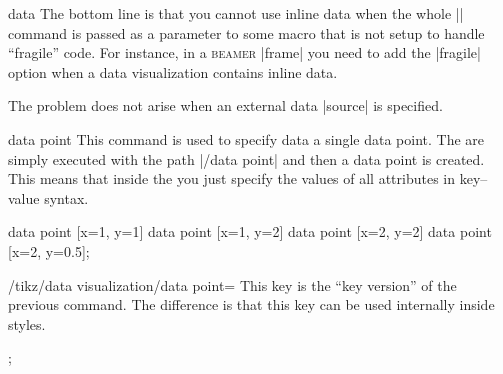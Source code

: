\begin{datavisualizationoperation}{data}{}
    The bottom line is that you cannot use inline data when the whole
    |\datavisualization| command is passed as a parameter to some macro that is
    not setup to handle ``fragile'' code. For instance, in a \textsc{beamer}
    |frame| you need to add the |fragile| option when a data visualization
    contains inline data.

    The problem does not arise when an external data |source| is specified.
\end{datavisualizationoperation}

\begin{datavisualizationoperation}{data point}{}
    This command is used to specify data a single data point. The
     are simply executed with the path |/data point| and then a
    data point is created. This means that inside the  you just
    specify the values of all attributes in key--value syntax.
\begin{codeexample}[]
\tikz {}
  data point [x=1, y=1]    data point [x=1, y=2]
  data point [x=2, y=2]    data point [x=2, y=0.5];
\end{codeexample}
\end{datavisualizationoperation}

\begin{key}{/tikz/data visualization/data point=}
    This key is the ``key version'' of the previous command. The difference is
    that this key can be used internally inside styles.
\begin{codeexample}[]
\tikz \datavisualization
[ school book axes, visualize as line,
  horizontal=1,
  horizontal=2 ];
\end{codeexample}
\end{key}

